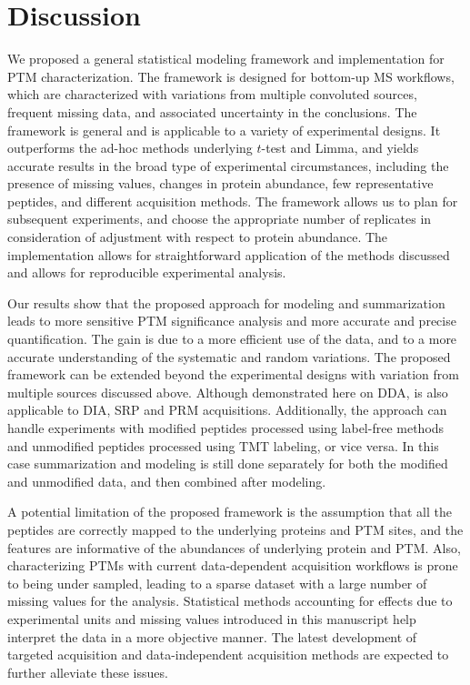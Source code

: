 \documentclass[mcp]{article}
\numberwithin{table}{section}
\begin{document}
\section{Discussion}

We proposed a general statistical modeling framework and implementation for PTM characterization. The framework is designed for bottom-up MS workflows, which are characterized with variations from multiple convoluted sources, frequent missing data, and associated uncertainty in the conclusions. The framework is general and is applicable to a variety of experimental designs. It outperforms the ad-hoc methods underlying $t$-test and Limma, and yields accurate results in the broad type of experimental circumstances, including the presence of missing values, changes in protein abundance, few representative peptides, and different acquisition methods. The framework allows us to plan for subsequent experiments, and choose the appropriate number of replicates in consideration of adjustment with respect to protein abundance. The implementation allows for straightforward application of the methods discussed and allows for reproducible experimental analysis.

Our results show that the proposed approach for modeling and summarization leads to more sensitive PTM significance analysis and more accurate and precise quantification. The gain is due to a more efficient use of the data, and to a more accurate understanding of the systematic and random variations. The proposed framework can be extended beyond the experimental designs with variation from multiple sources discussed above. Although demonstrated here on DDA, is also applicable to DIA, SRP and PRM acquisitions. Additionally, the approach can handle experiments with modified peptides processed using label-free methods and unmodified peptides processed using TMT labeling, or vice versa. In this case summarization and modeling is still done separately for both the modified and unmodified data, and then combined after modeling.

A potential limitation of the proposed framework is the assumption that all the peptides are correctly mapped to the underlying proteins and PTM sites, and the features are informative of the abundances of underlying protein and PTM. Also, characterizing PTMs with current data-dependent acquisition workflows is prone to being under sampled, leading to a sparse dataset with a large number of missing values for the analysis. Statistical methods accounting for effects due to experimental units and missing values introduced in this manuscript help interpret the data in a more objective manner. The latest development of targeted acquisition and data-independent acquisition methods are expected to further alleviate these issues. 
\end{document}
